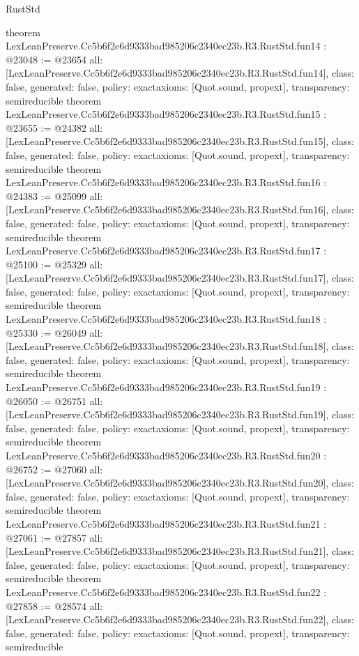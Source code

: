 \begin{lexlean}{RustStd}
\begin{coremodule}
{}
theorem LexLeanPreserve.Cc5b6f2e6d9333bad985206c2340ec23b.R3.RustStd.fun14 : @23048 := @23654 {
  all: [LexLeanPreserve.Cc5b6f2e6d9333bad985206c2340ec23b.R3.RustStd.fun14],
  class: false,
  generated: false,
  policy: exact{axioms: [Quot.sound, propext]},
  transparency: semireducible
}
theorem LexLeanPreserve.Cc5b6f2e6d9333bad985206c2340ec23b.R3.RustStd.fun15 : @23655 := @24382 {
  all: [LexLeanPreserve.Cc5b6f2e6d9333bad985206c2340ec23b.R3.RustStd.fun15],
  class: false,
  generated: false,
  policy: exact{axioms: [Quot.sound, propext]},
  transparency: semireducible
}
theorem LexLeanPreserve.Cc5b6f2e6d9333bad985206c2340ec23b.R3.RustStd.fun16 : @24383 := @25099 {
  all: [LexLeanPreserve.Cc5b6f2e6d9333bad985206c2340ec23b.R3.RustStd.fun16],
  class: false,
  generated: false,
  policy: exact{axioms: [Quot.sound, propext]},
  transparency: semireducible
}
theorem LexLeanPreserve.Cc5b6f2e6d9333bad985206c2340ec23b.R3.RustStd.fun17 : @25100 := @25329 {
  all: [LexLeanPreserve.Cc5b6f2e6d9333bad985206c2340ec23b.R3.RustStd.fun17],
  class: false,
  generated: false,
  policy: exact{axioms: [Quot.sound, propext]},
  transparency: semireducible
}
theorem LexLeanPreserve.Cc5b6f2e6d9333bad985206c2340ec23b.R3.RustStd.fun18 : @25330 := @26049 {
  all: [LexLeanPreserve.Cc5b6f2e6d9333bad985206c2340ec23b.R3.RustStd.fun18],
  class: false,
  generated: false,
  policy: exact{axioms: [Quot.sound, propext]},
  transparency: semireducible
}
theorem LexLeanPreserve.Cc5b6f2e6d9333bad985206c2340ec23b.R3.RustStd.fun19 : @26050 := @26751 {
  all: [LexLeanPreserve.Cc5b6f2e6d9333bad985206c2340ec23b.R3.RustStd.fun19],
  class: false,
  generated: false,
  policy: exact{axioms: [Quot.sound, propext]},
  transparency: semireducible
}
theorem LexLeanPreserve.Cc5b6f2e6d9333bad985206c2340ec23b.R3.RustStd.fun20 : @26752 := @27060 {
  all: [LexLeanPreserve.Cc5b6f2e6d9333bad985206c2340ec23b.R3.RustStd.fun20],
  class: false,
  generated: false,
  policy: exact{axioms: [Quot.sound, propext]},
  transparency: semireducible
}
theorem LexLeanPreserve.Cc5b6f2e6d9333bad985206c2340ec23b.R3.RustStd.fun21 : @27061 := @27857 {
  all: [LexLeanPreserve.Cc5b6f2e6d9333bad985206c2340ec23b.R3.RustStd.fun21],
  class: false,
  generated: false,
  policy: exact{axioms: [Quot.sound, propext]},
  transparency: semireducible
}
theorem LexLeanPreserve.Cc5b6f2e6d9333bad985206c2340ec23b.R3.RustStd.fun22 : @27858 := @28574 {
  all: [LexLeanPreserve.Cc5b6f2e6d9333bad985206c2340ec23b.R3.RustStd.fun22],
  class: false,
  generated: false,
  policy: exact{axioms: [Quot.sound, propext]},
  transparency: semireducible
}
\end{coremodule}
\end{lexlean}

